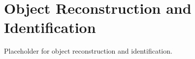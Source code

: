\chapter{Object Reconstruction and Identification}
\label{ch:objects}

Placeholder for object reconstruction and identification.
